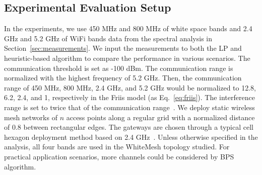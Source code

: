 \subsection{Experimental Evaluation Setup}
\label{subsec:design}
In the experiments, we use 450 MHz and 800 MHz of white space bands and 2.4 GHz and 5.2 GHz of WiFi bands
data from the spectral analysis in Section~\ref{sec:measurements}.
We input the measurements to both the LP and heuristic-based algorithm to compare 
the performance in various scenarios. The communication threshold is set as -100 dBm. The 
communication range is normalized with the highest frequency of 5.2 GHz. Then, the communication 
range of 450 MHz, 800 MHz, 2.4 GHz, and 5.2 GHz would be normalized to 12.8, 6.2, 2.4, and 1, 
respectively in the Friis model (as Eq.~\ref{eq:friis}). 
The interference range is set to twice that of the communication range~\cite{raniwala2005architecture}. 
We deploy static wireless mesh networks of $n$ access points along a regular grid with a normalized 
distance of 0.8 between rectangular edges. The gateways are chosen through a typical cell hexagon 
deployment method based on 2.4 GHz~\cite{meguerdichian2001exposure}. Unless otherwise specified 
in the analysis, all four bands are used in the WhiteMesh topology studied. For practical application 
scenarios, more channels could be considered by BPS algorithm.


